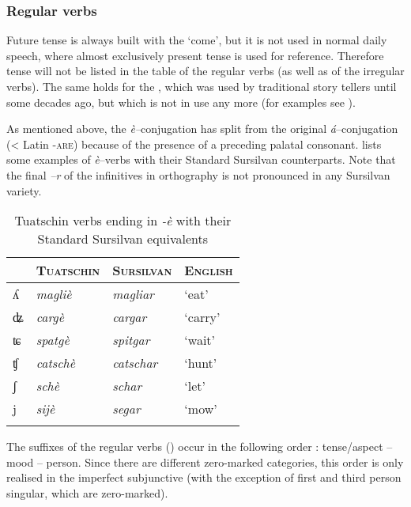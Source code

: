 \subsubsection{Regular verbs}\label{4.1.1.2}
Future tense is always built with the   `come', but it is not used in normal daily speech, where almost exclusively present tense is used for  reference. Therefore  tense will not be listed in the table of the regular verbs (as well as of the irregular verbs). The same holds for the , which was used by traditional story tellers until some decades ago, but which is not in use any more (for examples see ).

As mentioned above, the \textit{è--}conjugation has split from the original \textit{á}--conjuga\-tion (< Latin \textsc{-are})  because of the presence of a preceding palatal consonant.  lists some examples of \textit{è}--verbs with their Standard Sursilvan counterparts. Note that the final \textit{--r} of the infinitives in  orthography is not pronounced in any Sursilvan variety.

\begin{table}
\caption{Tuatschin verbs ending in \textit{-è} with their Standard Sursilvan equivalents}
\label{tab:èconj}
 \begin{tabular}{llll}
 \lsptoprule
&\textsc{Tuatschin}  & \textsc{Sursilvan}  & \textsc{English} \\
  \midrule
 ʎ & \textit{magliè} &\textit{magliar}& `eat' \\
ʥ&\textit{cargè}&\textit{cargar}&`carry'\\
ʨ&\textit{spatgè}&\textit{spitgar}&`wait'\\
ʧ&\textit{catschè}&\textit{catschar}&`hunt'\\
ʃ&\textit{schè}&\textit{schar}&`let'\\
j&\textit{sijè}&\textit{segar}&`mow'\\   
 \lspbottomrule
 \end{tabular}
\end{table}

\label{sec:4.1.1.2.1}
The suffixes of the regular verbs () occur in the following order : tense{\slash}aspect – mood – person. Since there are different zero-marked categories, this order is only realised in  the imperfect subjunctive (with the exception of first and third person singular, which are zero-marked).

